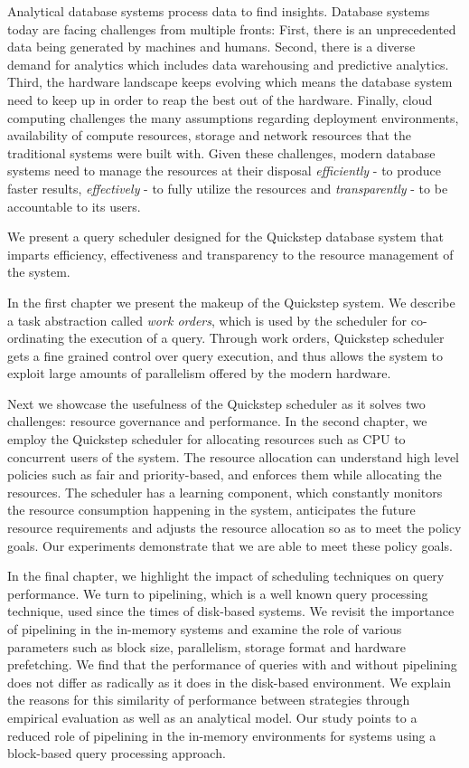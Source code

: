 Analytical database systems process data to find insights. 
Database systems today are facing challenges from multiple fronts: First, there is an unprecedented data being generated by machines and humans.
Second, there is a diverse demand for analytics which includes data warehousing and predictive analytics.
Third, the hardware landscape keeps evolving which means the database system need to keep up in order to reap the best out of the hardware.
Finally, cloud computing challenges the many assumptions regarding deployment environments, availability of compute resources, storage and network resources that the traditional systems were built with.
Given these challenges, modern database systems need to manage the resources at their disposal \textit{efficiently} - to produce faster results, \textit{effectively} - to fully utilize the resources and \textit{transparently} - to be accountable to its users.

We present a query scheduler designed for the Quickstep database system that imparts efficiency, effectiveness and transparency to the resource management of the system. 

In the first chapter we present the makeup of the Quickstep system. 
We describe a task abstraction called \textit{work orders}, which is used by the scheduler for co-ordinating the execution of a query.
Through work orders, Quickstep scheduler gets a fine grained control over query execution, and thus allows the system to exploit large amounts of parallelism offered by the modern hardware.

Next we showcase the usefulness of the Quickstep scheduler as it solves two challenges: resource governance and performance.
In the second chapter, we employ the Quickstep scheduler for allocating resources such as CPU to concurrent users of the system.
The resource allocation can understand high level policies such as fair and priority-based, and enforces them while allocating the resources.
The scheduler has a learning component, which constantly monitors the resource consumption happening in the system, anticipates the future resource requirements and adjusts the resource allocation so as to meet the policy goals.
Our experiments demonstrate that we are able to meet these policy goals.

In the final chapter, we highlight the impact of scheduling techniques on query performance.
We turn to pipelining, which is a well known query processing technique, used since the times of disk-based systems.
We revisit the importance of pipelining in the in-memory systems and examine the role of various parameters such as block size, parallelism, storage format and hardware prefetching.
We find that the performance of queries with and without pipelining does not differ as radically as it does in the disk-based environment.
We explain the reasons for this similarity of performance between strategies through empirical evaluation as well as an analytical model.
Our study points to a reduced role of pipelining in the in-memory environments for systems using a block-based query processing approach. 